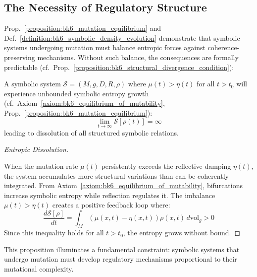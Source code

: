 \subsection{The Necessity of Regulatory Structure}
\label{subsec:bk6_the_necessity_of_regulatory_structure}
Prop.~\ref{proposition:bk6_mutation_equilibrium} and Def.~\ref{definition:bk6_symbolic_density_evolution} demonstrate that symbolic systems undergoing mutation must balance entropic forces against coherence-preserving mechanisms. Without such balance, the consequences are formally predictable (cf.~Prop.~\ref{proposition:bk6_structural_divergence_condition}):
\begin{proposition}
\label{proposition:bk6_entropic_dissolution}
A symbolic system $\mathcal{S} = (M, g, D, R, \rho)$ where $\mu(t) > \eta(t)$ for all $t > t_0$ will experience unbounded symbolic entropy growth (cf.~Axiom~\ref{axiom:bk6_equilibrium_of_mutability}, Prop.~\ref{proposition:bk6_mutation_equilibrium}):
\begin{equation}
\lim_{t \to \infty} \mathcal{S}[\rho(t)] = \infty
\end{equation}
leading to dissolution of all structured symbolic relations.
\begin{proof}[Entropic Dissolution]
\label{proof:bk6_entropic_dissolution}
\leavevmode

When the mutation rate $\mu(t)$ persistently exceeds the reflective damping $\eta(t)$, the system accumulates more structural variations than can be coherently integrated.  
From Axiom~\ref{axiom:bk6_equilibrium_of_mutability}, bifurcations increase symbolic entropy while reflection regulates it.  
The imbalance $\mu(t) > \eta(t)$ creates a positive feedback loop where:
\[
\frac{d\mathcal{S}[\rho]}{dt} = \int_M (\mu(x,t) - \eta(x,t))\rho(x,t) \, d\text{vol}_g > 0
\]
Since this inequality holds for all \( t > t_0 \), the entropy grows without bound.
\end{proof}
\end{proposition}
This proposition illuminates a fundamental constraint: symbolic systems that undergo mutation must develop regulatory mechanisms proportional to their mutational complexity.
